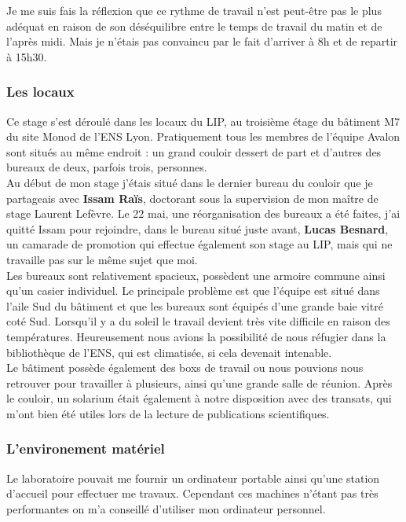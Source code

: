 Je me suis fais la réflexion que ce rythme de travail n'est peut-être pas le plus adéquat en raison de son déséquilibre entre le temps de travail du matin et de l'après midi. Mais je n'étais pas convaincu par le fait d'arriver à 8h et de repartir à 15h30.
 
\subsubsection{Les locaux}
Ce stage s'est déroulé dans les locaux du LIP, au troisième étage du bâtiment M7 du site Monod de l'ENS Lyon. Pratiquement tous les membres de l'équipe Avalon sont situés au même endroit : un grand couloir dessert de part et d'autres des bureaux de deux, parfois trois, personnes.\\

Au début de mon stage j'étais situé dans le dernier bureau du couloir que je partageais avec \textbf{Issam Raïs}, doctorant sous la supervision de mon maître de stage Laurent Lefèvre. Le 22 mai, une réorganisation des bureaux a été faites, j'ai quitté Issam pour rejoindre, dans le bureau situé juste avant, \textbf{Lucas Besnard}, un camarade de promotion qui effectue également son stage au LIP, mais qui ne travaille pas sur le même sujet que moi.\\

Les bureaux sont relativement spacieux, possèdent une armoire commune ainsi qu'un casier individuel. Le principale problème est que l'équipe est situé dans l'aile Sud du bâtiment et que les bureaux sont équipés d'une grande baie vitré coté Sud. Lorsqu'il y a du soleil le travail devient très vite difficile en raison des températures. Heureusement nous avions la possibilité de nous réfugier dans la bibliothèque de l'ENS, qui est climatisée, si cela devenait intenable.\\

Le bâtiment possède également des boxs de travail ou nous pouvions nous retrouver pour travailler à plusieurs, ainsi qu'une grande salle de réunion. Après le couloir, un solarium était également à notre disposition avec des transats, qui m'ont bien été utiles lors de la lecture de publications scientifiques.

\subsubsection{L'environement matériel}
Le laboratoire pouvait me fournir un ordinateur portable ainsi qu'une station d'accueil pour effectuer me travaux. Cependant ces machines n'étant pas très performantes on m'a conseillé d'utiliser mon ordinateur personnel.\\

